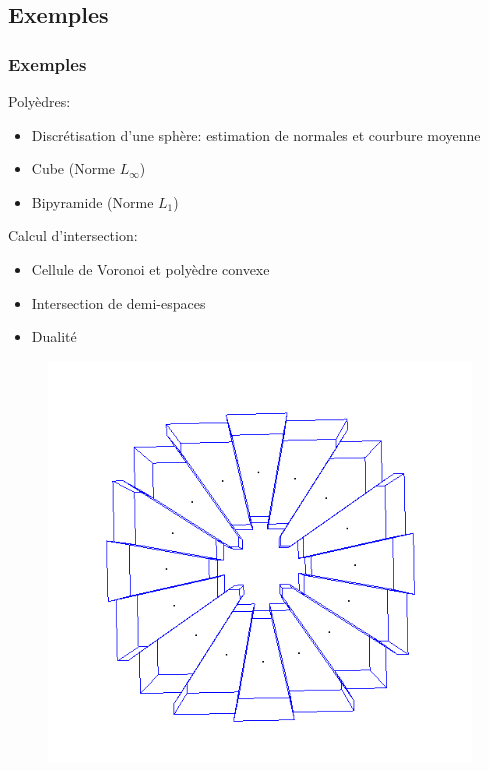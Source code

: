 \documentclass{beamer}
\begin{document}
\subsection{Exemples}
\begin{frame}
    \frametitle{Exemples}

    Polyèdres:
    \begin{itemize}
        \item Discrétisation d'une sphère: estimation de normales et courbure
            moyenne
        \item Cube (Norme $ L_{\infty} $)
        \item Bipyramide (Norme $ L_1 $)
    \end{itemize}

    Calcul d'intersection:
    \begin{itemize}
        \item Cellule de Voronoi et polyèdre convexe
        \item Intersection de demi-espaces
        \item Dualité
    \end{itemize}

    \begin{figure}
        \centering
        \includegraphics[scale=0.2]{img/circle-cube-inter}
    \end{figure}
\end{frame}
\end{document}
